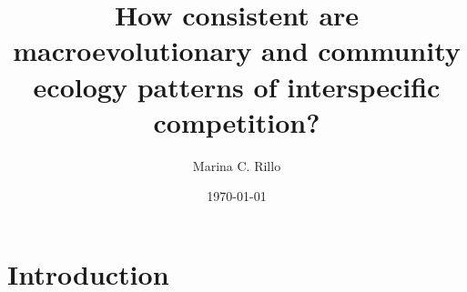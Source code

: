 \documentclass[a4paper]{article}
\title{How consistent are macroevolutionary and community ecology patterns of interspecific competition?}
\author{Marina C. Rillo} %
\date{\today}
\begin{document}
\maketitle

\begin{abstract}


\end{abstract}

\section{Introduction}
\label{sec:introduction}







\end{document}
